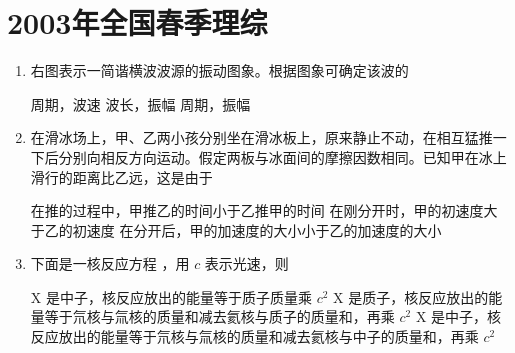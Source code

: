 \documentclass[\gkver]{gaokaozhenti}
\begin{document}
\chapter{2003年全国春季理综}

\begin{enumerate}
\item
右图表示一简谐横波波源的振动图象。根据图象可确定该波的


{周期，波速}
{波长，振幅}
{周期，振幅}


\item
在滑冰场上，甲、乙两小孩分别坐在滑冰板上，原来静止不动，在相互猛推一下后分别向相反方向运动。假定两板与冰面间的摩擦因数相同。已知甲在冰上滑行的距离比乙远，这是由于

{在推的过程中，甲推乙的时间小于乙推甲的时间}
{在刚分开时，甲的初速度大于乙的初速度}
{在分开后，甲的加速度的大小小于乙的加速度的大小}


\item
下面是一核反应方程 ，用 $c$ 表示光速，则

{X 是中子，核反应放出的能量等于质子质量乘 $c^{2}$}
{X 是质子，核反应放出的能量等于氘核与氚核的质量和减去氦核与质子的质量和，再乘 $c^{2}$}
{X 是中子，核反应放出的能量等于氘核与氚核的质量和减去氦核与中子的质量和，再乘 $c^{2}$}



\end{enumerate}
\end{document}
